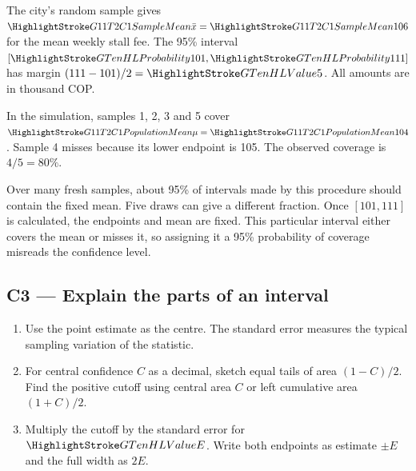 \noindent
\begin{minipage}[t]{0.46\linewidth}
\vspace{0pt}
 The city's random sample gives \(\SampleMean{\bar x}=\SampleMean{106}\) for the mean weekly stall fee. The 95\% interval \([\Endpoint{101},\Endpoint{111}]\) has margin \((111-101)/2=\Margin{5}\). All amounts are in thousand COP.

In the simulation, samples 1, 2, 3 and 5 cover \(\PopulationMean{\mu}=\PopulationMean{104}\). Sample 4 misses because its lower endpoint is 105. The observed coverage is \(4/5=80\%\).
\end{minipage}\hfill
\begin{minipage}[t]{0.51\linewidth}
\vspace{0pt}
\centering
\end{minipage}

Over many fresh samples, about 95\% of intervals made by this procedure should contain the fixed mean. Five draws can give a different fraction. Once \([101,111]\) is calculated, the endpoints and mean are fixed. This particular interval either covers the mean or misses it, so assigning it a 95\% probability of coverage misreads the confidence level.
\par\nobreak
{}

\subsection{C3 --- Explain the parts of an interval}\label{crit:c3}
\begin{enumerate}
  \item Use the point estimate as the centre. The standard error measures the typical sampling variation of the statistic.
  \item For central confidence \(C\) as a decimal, sketch equal tails of area \((1-C)/2\). Find the positive cutoff using central area \(C\) or left cumulative area \((1+C)/2\).
  \item Multiply the cutoff by the standard error for \(\Margin{E}\). Write both endpoints as estimate \(\pm E\) and the full width as \(2E\).
\end{enumerate}


